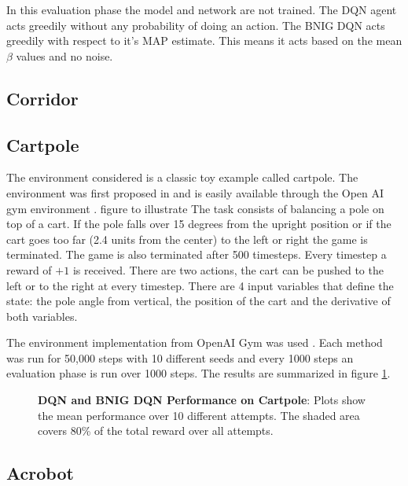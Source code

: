 In this evaluation phase the model and network are not trained. The DQN agent acts greedily without any probability of doing an action. The BNIG DQN acts greedily with respect to it's MAP estimate. This means it acts based on the mean $\beta$ values and no noise.

\subsection{Corridor}

\todo

\subsection{Cartpole}

The environment considered is a classic toy example called cartpole. The environment was first proposed in \cite{barto_sutton_1983} and is easily available through the Open AI gym environment \citep{brockman_2016}.
\todo figure to illustrate 
The task consists of balancing a pole on top of a cart. If the pole falls over 15 degrees from the upright position or if the cart goes too far (2.4 units from the center) to the left or right the game is terminated. The game is also terminated after 500 timesteps. Every timestep a reward of $+1$ is received. There are two actions, the cart can be pushed to the left or to the right at every timestep. There are 4 input variables that define the state: the pole angle from vertical, the position of the cart and the derivative of both variables. 

The environment implementation from OpenAI Gym was used \citep{OpenAI_gym}. Each method was run for 50,000 steps with 10 different seeds and every 1000 steps an evaluation phase is run over 1000 steps. The results are summarized in figure \ref{fig:nn_cartpole}.

\begin{figure}[H]
    \centering
    \caption{\textbf{DQN and BNIG DQN Performance on Cartpole}: Plots show the mean performance over 10 different attempts. The shaded area covers 80\% of the total reward over all attempts.}
    \label{fig:nn_cartpole}
\end{figure}

\subsection{Acrobot}

